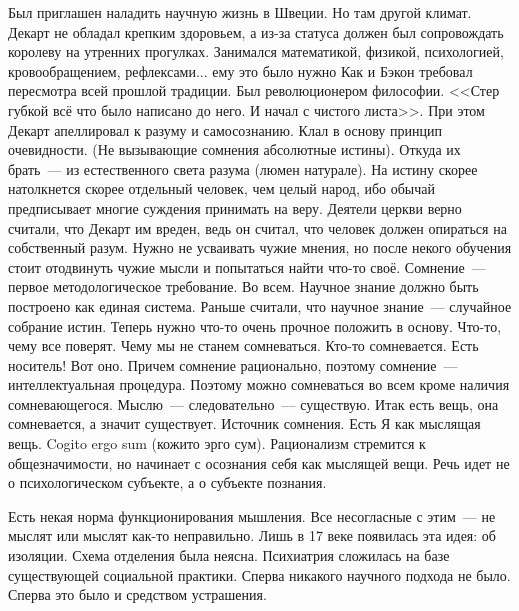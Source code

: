Был приглашен наладить научную жизнь в Швеции. Но там другой климат. Декарт не обладал крепким здоровьем, а из-за статуса должен был сопровождать королеву на утренних прогулках. Занимался математикой, физикой, психологией, кровообращением, рефлексами... ему это было нужно
Как и Бэкон требовал пересмотра всей прошлой традиции. Был революционером философии. <<Стер губкой всё что было написано до него. И начал с чистого листа>>. При этом Декарт апеллировал к разуму и самосознанию. Клал в основу принцип очевидности. (Не вызывающие сомнения абсолютные истины). Откуда их брать~--- из естественного света разума (люмен натурале). На истину скорее натолкнется скорее отдельный человек, чем целый народ, ибо обычай предписывает многие суждения принимать на веру. Деятели церкви верно считали, что Декарт им вреден, ведь он считал, что человек должен опираться на собственный разум. Нужно не усваивать чужие мнения, но после некого обучения стоит отодвинуть чужие мысли и попытаться найти что-то своё.
Сомнение~--- первое методологическое требование. Во всем.
Научное знание должно быть построено как единая система. Раньше считали, что научное знание~--- случайное собрание истин. Теперь нужно что-то очень прочное положить в основу. Что-то, чему все поверят.
Чему мы не станем сомневаться. Кто-то сомневается. Есть носитель! Вот оно. Причем сомнение рационально, поэтому сомнение~--- интеллектуальная процедура. Поэтому можно сомневаться во всем кроме наличия сомневающегося. Мыслю~--- следовательно~--- существую. Итак есть вещь, она сомневается, а значит существует. Источник сомнения. Есть Я как мыслящая вещь. Cogito ergo sum (кожито эрго сум). Рационализм стремится к общезначимости, но начинает с осознания себя как мыслящей вещи. Речь идет не о психологическом субъекте, а о субъекте познания.

Есть некая норма функционирования мышления. Все несогласные с этим~--- не мыслят или мыслят как-то неправильно. Лишь в 17 веке появилась эта идея: об изоляции. Схема отделения была неясна. Психиатрия сложилась на базе существующей социальной практики. Сперва никакого научного подхода не было. Сперва это было и средством устрашения.

